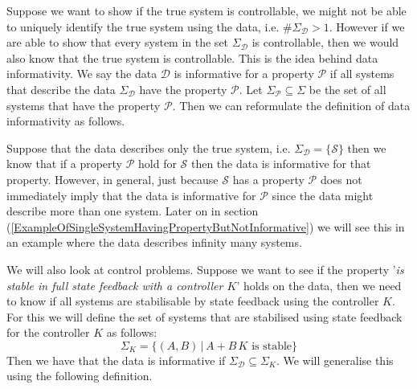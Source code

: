 Suppose we want to show if the true system is controllable, we might not be able to uniquely identify the true system using the data, i.e. $\# \Sigma_\mathcal{D} > 1$. However if we are able to show that every system in the set $\Sigma_\mathcal{D}$ is controllable, then we would also know that the true system is controllable. This is the idea behind data informativity. We say the data $\mathcal{D}$ is informative for a property $\mathcal{P}$ if all systems that describe the data $\Sigma_\mathcal{D}$ have the property $\mathcal{P}$. Let $\Sigma_\mathcal{P} \subseteq \Sigma$ be the set of all systems that have the property $\mathcal{P}$. Then we can reformulate the definition of data informativity as follows.


Suppose that the data describes only the true system, i.e. $\Sigma_{\mathcal{D}} = \{ \mathcal{S} \}$ then we know that if a property $\mathcal{P}$ hold for $\mathcal{S}$ then the data is informative for that property. However, in general, just because $\mathcal{S}$ has a property $\mathcal{P}$ does not immediately imply that the data is informative for $\mathcal{P}$ since the data might describe more than one system. Later on in section (\ref{ExampleOfSingleSystemHavingPropertyButNotInformative}) we will see this in an example where the data describes infinity many systems. 

We will also look at control problems. Suppose we want to see if the property '\textit{is stable in full state feedback with a controller $K$}' holds on the data, then we need to know if all systems are stabilisable by state feedback using the controller $K$. For this we will define the set of systems that are stabilised using state feedback for the controller $K$ as follows:
\begin{equation} \label{SigmaK}
	\Sigma_K = \{ (A,B) \, | \, A + B \, K \mbox{ is stable} \}
\end{equation}
Then we have that the data is informative if $\Sigma_\mathcal{D} \subseteq \Sigma_K$. We will generalise this using the following definition.



